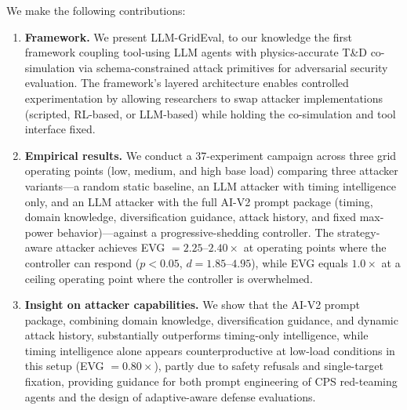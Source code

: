 We make the following contributions:
\begin{enumerate}[leftmargin=*]
\item \textbf{Framework.} We present LLM-GridEval, to our knowledge the first framework coupling tool-using LLM agents with physics-accurate T\&D co-simulation via schema-constrained attack primitives for adversarial security evaluation. The framework's layered architecture enables controlled experimentation by allowing researchers to swap attacker implementations (scripted, RL-based, or LLM-based) while holding the co-simulation and tool interface fixed.

\item \textbf{Empirical results.} We conduct a 37-experiment campaign across three grid operating points (low, medium, and high base load) comparing three attacker variants---a random static baseline, an LLM attacker with timing intelligence only, and an LLM attacker with the full AI-V2 prompt package (timing, domain knowledge, diversification guidance, attack history, and fixed max-power behavior)---against a progressive-shedding controller. The strategy-aware attacker achieves EVG $= 2.25$--$2.40\times$ at operating points where the controller can respond ($p < 0.05$, $d = 1.85$--$4.95$), while EVG equals $1.0\times$ at a ceiling operating point where the controller is overwhelmed.

\item \textbf{Insight on attacker capabilities.} We show that the AI-V2 prompt package, combining domain knowledge, diversification guidance, and dynamic attack history, substantially outperforms timing-only intelligence, while timing intelligence alone appears counterproductive at low-load conditions in this setup (EVG $= 0.80\times$), partly due to safety refusals and single-target fixation, providing guidance for both prompt engineering of CPS red-teaming agents and the design of adaptive-aware defense evaluations.
\end{enumerate}
